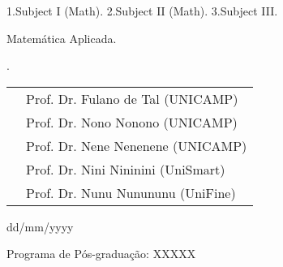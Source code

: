   1.Subject I (Math).
2.Subject II (Math).
3.Subject III.

 Matem\'atica Aplicada.


. %

\noindent 
\begin{tabular}{ll}
    \hspace{-0.1cm}{Banca Examinadora:} & Prof. Dr. Fulano de Tal (UNICAMP)\\
    & Prof. Dr. Nono Nonono  (UNICAMP)\\
    & Prof. Dr. Nene Nenenene (UNICAMP)\\
    & Prof. Dr. Nini Nininini (UniSmart)\\
    & Prof. Dr. Nunu Nunununu (UniFine)\\
\end{tabular}

 dd/mm/yyyy

\noindent Programa de P\'os-gradua\c{c}\~ao: XXXXX
